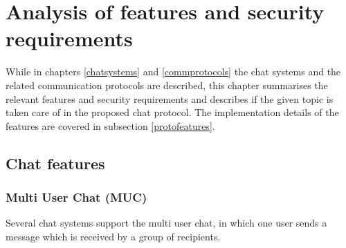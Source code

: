 \chapter{Analysis of features and security requirements}
\label{requirements}
While in chapters \ref{chatsystems} and \ref{commprotocols}
the chat systems and the related communication protocols
are described, this chapter summarises the relevant features
and security requirements and describes if the
given topic is taken care of in the proposed chat protocol.
The implementation details of the features are covered in
subsection \ref{protofeatures}.
\section{Chat features}
\subsection{Multi User Chat (MUC)}
Several chat systems support the multi user chat, in which one user sends a message
which is received by a group of recipients.

